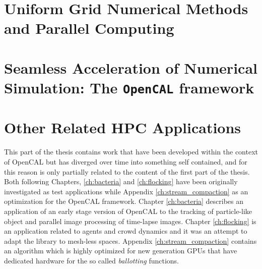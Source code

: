\documentclass[%
    twoside, openright, titlepage, numbers=noenddot,%
    cleardoublepage=plain,%
    abstractoff,
    BCOR=5.5mm, paper=a4, fontsize=11pt,%
]{scrreprt}
\begin{document}
\frenchspacing
\raggedbottom%
\pagestyle{scrplain}

%
%
%
%
\cleardoublepage\setcounter{page}{1}

%
%




\cleardoublepage
\cleardoublepage
\cleardoublepage
\pagestyle{headings}
\cleardoublepage

%
%

\cleardoublepage

\cleardoublepage
\part{Uniform Grid Numerical Methods and Parallel Computing}


\cleardoublepage%

\cleardoublepage

\cleardoublepage

\part{Seamless Acceleration of Numerical Simulation: The \texttt{OpenCAL} framework}
\cleardoublepage
%


\cleardoublepage

\cleardoublepage

\cleardoublepage

\part{Other Related HPC Applications}
\cleardoublepage
This part of the thesis contains work that have been developed within the context of OpenCAL but has diverged over time into something self contained, and for this reason is only partially related to the content of the first part of the thesis.
Both following Chapters, \ref{ch:bacteria} and \ref{ch:flocking}    have been originally investigated as test applications while Appendix \ref{ch:stream_compaction} as an optimization for the OpenCAL framework.
Chapter \ref{ch:bacteria} describes an application of an early stage version of OpenCAL to the tracking of particle-like object and parallel image processing of time-lapse images.
Chapter \ref{ch:flocking} is an application related to agents and crowd dynamics and it was an attempt to adapt the library to mesh-less spaces.
Appendix  \ref{ch:stream_compaction} contains an algorithm which is highly optimized for new generation GPUs that have dedicated hardware for the so called \textit{ballotting} functions.
\end{document}
